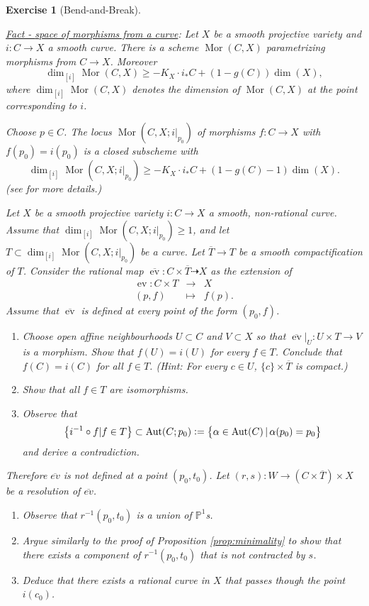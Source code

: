 \documentclass[a4paper,11pt]{amsart}
\newtheorem{exercise}[theorem]{Exercise}
\def\dim{\operatorname{dim}}
\def\Aut{\operatorname{Aut}}
\def\Mor{\operatorname{Mor}}
\def\ev{\operatorname{ev}}
\newcommand{\PP}{\mathbb{P}}
\newcommand{\defeq}{\vcentcolon=}
\newcommand{\rmap}{\dashrightarrow}
\begin{document}
\begin{exercise}[{Bend-and-Break}]\label{exer:bendAndBreak}\leavevmode
	\begin{center}
		\begin{minipage}{.9\textwidth}
			{\underline{Fact - \emph{space of morphisms from a curve}}}:
			Let $X$ be a smooth projective variety and $i\colon C \to X$ a smooth curve.
			There is a scheme $\Mor(C,X)$  parametrizing morphisms from $C \to X$. 
			Moreover 
			\[
			\dim_{[i]}\Mor(C,X) \geq -K_X\cdot i_*C + (1-g(C))\dim(X),
			\] 
			where $\dim_{[i]}\Mor(C,X)$ denotes the dimension of $\Mor(C,X)$ at the point corresponding to $i$.
			
			Choose $p\in C$.
			The locus $\Mor(C,X; i|_{p_0})$ of morphisms $f\colon C \to X$ with $f(p_0) = i(p_0)$ is a closed subscheme with
			\[
			\dim_{[i]}\Mor(C,X; i|_{p_0}) \geq -K_X\cdot i_*C + (1-g(C) - 1)\dim(X).
			\]
			(see \cite[Section 2.3]{Debarre} for more details.)
		\end{minipage}
	\end{center}
	Let $X$ be a smooth projective variety $i\colon C \to X$ a smooth, non-rational curve. 
	Assume that $\dim_{[i]}\Mor(C,X; i|_{p_0}) \geq 1$, and let $T \subset \dim_{[i]}\Mor(C,X; i|_{p_0})$ be a curve.
	Let $\overline{T} \to T$ be a smooth compactification of $T$.
	Consider the rational map $\overline{\ev} \colon C \times \overline{T}  \rmap X$ as the extension of
	\[
	\begin{array}{ccc}
		\ev\colon C\times T & \to & X\\
		(p,f) & \mapsto & f(p).
	\end{array}
	\]		
	Assume that $\overline{\ev}$ is defined at every point of the form $(p_0,f)$.
	\begin{enumerate}
		\item Choose open affine neighbourhoods $U\subset C$ and $V \subset X$ so that $\overline{\ev}|_U \colon U \times T \to V$ is a morphism.
		Show that $f(U) = i(U)$ for every $f\in T$.
		Conclude that $f(C) = i(C)$ for all $f \in T$.
		{\small (Hint: For every $c \in U$, $\{c\}\times \overline{T}$ is compact.)}
		\item Show that all $f \in T$ are isomorphisms.
		\item Observe that 
		\[
		\big\{i^{-1} \circ f  | f \in T\big\} \subset \Aut(C;p_0) \defeq \big\{ \alpha \in \Aut(C) \,|\,\alpha(p_0) = p_0\big\}
		\]
		and derive a contradiction.
	\end{enumerate}
	
	Therefore $\overline{ev}$ is not defined at a point $(p_0,t_0)$.
	Let $(r,s) \colon W \to (C \times \overline{T}) \times X$ be a resolution of $\overline{ev}$.
	\begin{enumerate}[resume]
		\item Observe that $r^{-1}(p_0,t_0)$ is a union of $\PP^1$s.
		\item Argue similarly to the proof of Proposition \ref{prop:minimality} to show that there exists a component of $r^{-1}(p_0,t_0)$ that is not contracted by $s$.
		\item Deduce that there exists a rational curve in $X$ that passes though the point $i(c_0)$.
	\end{enumerate}
	

\end{exercise}
\end{document}
